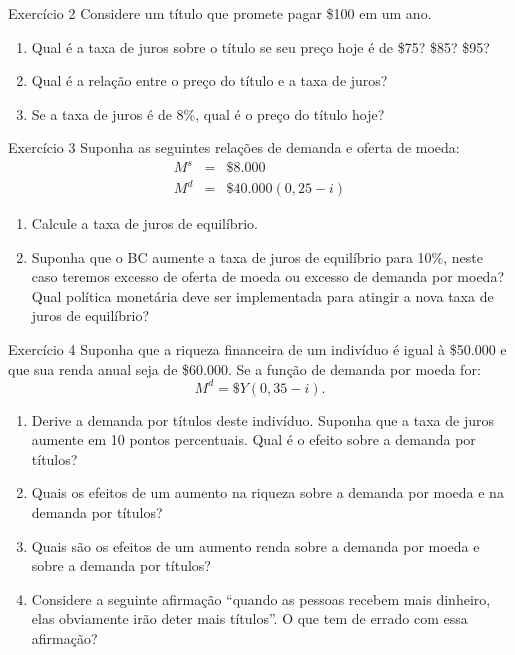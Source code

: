 \documentclass[10pt]{beamer}
\begin{document}
\begin{frame}[t]{Exercício 2}
    Considere um título que promete pagar \$100 em um ano.
    \bigskip
    \begin{enumerate}
        \item Qual é a taxa de juros sobre o título se seu preço hoje é de \$75? \$85? \$95?
        \bigskip
        \item Qual é a relação entre o preço do título e a taxa de juros?
        \bigskip
        \item Se a taxa de juros é de 8\%, qual é o preço do título hoje?
    \end{enumerate}
\end{frame}

\begin{frame}[t]{Exercício 3}
    Suponha as seguintes relações de demanda e oferta de moeda:
    \begin{eqnarray}
    M^s &=& \$8.000 \nonumber \\
    M^d &=& \$40.000(0,25-i) \nonumber
    \end{eqnarray}
    \bigskip
    \begin{enumerate}
        \item Calcule a taxa de juros de equilíbrio.
        \bigskip
        \item Suponha que o BC aumente a taxa de juros de equilíbrio para 10\%, neste caso teremos excesso de oferta de moeda ou excesso de demanda por moeda? Qual política monetária deve ser implementada para atingir a nova taxa de juros de equilíbrio?
    \end{enumerate}
\end{frame}

\begin{frame}[t]{Exercício 4}
    Suponha que a riqueza financeira de um indivíduo é igual à \$50.000 e que sua renda anual seja de \$60.000. Se a função de demanda por moeda for:
    \[
    M^d = \$Y(0,35-i).
    \]
    \bigskip
    \begin{enumerate}
        \item Derive a demanda por títulos deste indivíduo. Suponha que a taxa de juros aumente em 10 pontos percentuais. Qual é o efeito sobre a demanda por títulos?
        \bigskip
        \item Quais os efeitos de um aumento na riqueza sobre a demanda por moeda e na demanda por títulos?
        \bigskip
        \item Quais são os efeitos de um aumento renda sobre a demanda por moeda e sobre a demanda por títulos?
        \bigskip
        \item Considere a seguinte afirmação ``quando as pessoas recebem mais dinheiro, elas obviamente irão deter mais títulos''. O que tem de errado com essa afirmação?
    \end{enumerate}
\end{frame}
\end{document}

